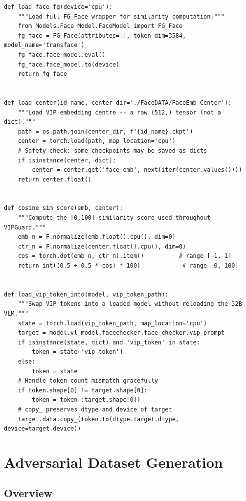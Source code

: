 \documentclass[12pt,a4paper]{article}
\begin{document}
\begin{lstlisting}[caption={attacks/utils.py -- Shared helper functions}]
def load_face_fg(device='cpu'):
    """Load full FG_Face wrapper for similarity computation."""
    from Models.Face_Model.FaceModel import FG_Face
    fg_face = FG_Face(attributes=[], token_dim=3584, model_name='transface')
    fg_face.face_model.eval()
    fg_face.face_model.to(device)
    return fg_face


def load_center(id_name, center_dir='./FaceDATA/FaceEmb_Center'):
    """Load VIP embedding centre -- a raw (512,) tensor (not a dict)."""
    path = os.path.join(center_dir, f'{id_name}.ckpt')
    center = torch.load(path, map_location='cpu')
    # Safety check: some checkpoints may be saved as dicts
    if isinstance(center, dict):
        center = center.get('face_emb', next(iter(center.values())))
    return center.float()


def cosine_sim_score(emb, center):
    """Compute the [0,100] similarity score used throughout VIPGuard."""
    emb_n = F.normalize(emb.float().cpu(), dim=0)
    ctr_n = F.normalize(center.float().cpu(), dim=0)
    cos = torch.dot(emb_n, ctr_n).item()          # range [-1, 1]
    return int((0.5 + 0.5 * cos) * 100)            # range [0, 100]


def load_vip_token_into(model, vip_token_path):
    """Swap VIP tokens into a loaded model without reloading the 32B VLM."""
    state = torch.load(vip_token_path, map_location='cpu')
    target = model.vl_model.facechecker.face_checker.vip_prompt
    if isinstance(state, dict) and 'vip_token' in state:
        token = state['vip_token']
    else:
        token = state
    # Handle token count mismatch gracefully
    if token.shape[0] != target.shape[0]:
        token = token[:target.shape[0]]
    # copy_ preserves dtype and device of target
    target.data.copy_(token.to(dtype=target.dtype, device=target.device))
\end{lstlisting}

\section{Adversarial Dataset Generation}

\subsection{Overview}
\end{document}
